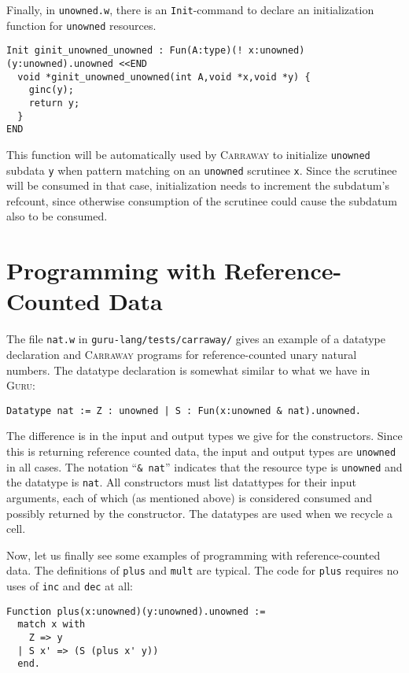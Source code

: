 \documentclass{book}[12pt]
\newcommand{\guru}[0]{\textsc{Guru}\xspace}
\newcommand{\carraway}[0]{\textsc{Carraway}\xspace}
\begin{document}
\noindent Finally, in \texttt{unowned.w}, there is an \texttt{Init}-command
to declare an initialization function for \texttt{unowned} resources.  

\begin{verbatim}
Init ginit_unowned_unowned : Fun(A:type)(! x:unowned)(y:unowned).unowned <<END
  void *ginit_unowned_unowned(int A,void *x,void *y) {
    ginc(y);
    return y;
  }
END
\end{verbatim}

\noindent This function will be automatically used by \carraway to
initialize \texttt{unowned} subdata \texttt{y} when pattern matching
on an \texttt{unowned} scrutinee \texttt{x}.  Since the scrutinee will
be consumed in that case, initialization needs to increment the
subdatum's refcount, since otherwise consumption of the scrutinee
could cause the subdatum also to be consumed.

\section{Programming with Reference-Counted Data}
\label{ch9:prog}

The file \texttt{nat.w} in \texttt{guru-lang/tests/carraway/} gives an
example of a datatype declaration and \carraway programs for
reference-counted unary natural numbers.  The datatype declaration
is somewhat similar to what we have in \guru:

\begin{verbatim}
Datatype nat := Z : unowned | S : Fun(x:unowned & nat).unowned.
\end{verbatim}

\noindent The difference is in the input and output types we give for
the constructors.  Since this is returning reference counted data, the
input and output types are \texttt{unowned} in all cases.  The
notation ``\texttt{\& nat}'' indicates that the resource type is
\texttt{unowned} and the datatype is \texttt{nat}.  All
constructors must list datattypes for their input arguments, each
of which (as mentioned above) is considered consumed and possibly
returned by the constructor.  The datatypes are used when we
recycle a cell.

Now, let us finally see some examples of programming with
reference-counted data.  The definitions of \texttt{plus} and
\texttt{mult} are typical.  The code for \texttt{plus} requires
no uses of \texttt{inc} and \texttt{dec} at all:

\begin{verbatim}
Function plus(x:unowned)(y:unowned).unowned :=
  match x with
    Z => y
  | S x' => (S (plus x' y))
  end.
\end{verbatim}
\end{document}
